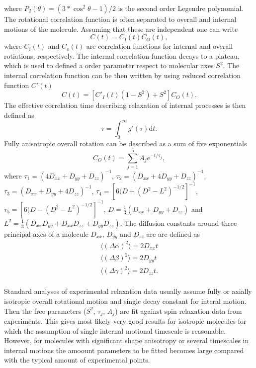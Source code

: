 \documentclass[pre,aps,floatfix,authordate1-4]{revtex4-1}
\begin{document}
where $P_2(\theta)=(3*\cos^2\theta-1)/2$ is the second order Legendre polynomial.
The rotational correlation function is often separated to overall and internal
motions of the molecule. Assuming that these are independent one can write
\begin{equation}
  C(t)=C_I(t)C_O(t),
\end{equation}
where $C_i(t)$ and $C_o(t)$ are correlation functions for internal and overall
rotiations, respectively. The internal correlation function decays to a plateau, which
is used to defined a order parameter respect to molecular axes $S^2$.
The internal correlation function can be then written by using
reduced correlation function $C'(t)$
\begin{equation}
  C(t)=[C'_I(t)(1-S^2)+S^2]C_O(t).
\end{equation}
The effective correlation time describing relaxation of internal
processes is then defined as
\begin{equation}
  \tau=\int_0^\infty g'(\tau) \mathrm{d}t.
\end{equation}
Fully anisotropic overall rotation can be described as a sum of five exponentials
\begin{equation}
  C_O(t)=\sum_{j=1}^5 A_j e^{-t/\tau_j},
\end{equation}
where
$\tau_1=(4D_{xx}+D_{yy}+D_{zz})^{-1}$,
$\tau_2=(D_{xx}+4D_{yy}+D_{zz})^{-1}$,
$\tau_3=(D_{xx}+D_{yy}+4D_{zz})^{-1}$,
$\tau_4=[6(D+(D^2-L^2)^{-1/2}]^{-1}$,
$\tau_5=[6(D-(D^2-L^2)^{-1/2}]^{-1}$,
$D=\frac{1}{3}(D_{xx}+D_{yy}+D_{zz})$ and 
$L^2=\frac{1}{3}(D_{xx}D_{yy}+D_{xx}D_{zz}+D_{yy}D_{zz})$.
The diffusion constants around
three principal axes of a molecule
$D_{xx}$, $D_{yy}$ and $D_{zz}$ are 
are defined as 
\begin{equation}
\begin{aligned}
  \langle (\Delta \alpha)^2 \rangle = 2 D_{xx} t \\
  \langle (\Delta \beta)^2 \rangle = 2 D_{yy} t \\
  \langle (\Delta \gamma)^2 \rangle = 2 D_{zz} t. \\
\end{aligned}
\end{equation}


Standard analyses of experimental relaxation data usually assume
fully or axially isotropic overall rotational motion and single
decay constant for interal motion. Then the free parameters
($S^2$, $\tau_j$, $A_j$) are fit against spin relaxation data
from experiments. This gives most likely very good results for
isotropic molecules for which the assumption of single internal
motional timescale is reasonable. However, for molecules with
significant shape anisotropy or several timescales in internal
motions the amoount parameters to be fitted becomes large compared
with the typical amount of experimental points.
\end{document}
